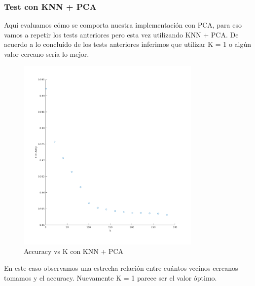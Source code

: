 \subsubsection*{Test con KNN + PCA}
Aquí evaluamos cómo se comporta nuestra implementación con PCA, para eso vamos a repetir los tests anteriores pero esta vez utilizando KNN + PCA.
De acuerdo a lo concluído de los tests anteriores inferimos que utilizar K = 1 o algún valor cercano sería lo mejor. 



\begin{figure}[H]
	\centering
	\includegraphics[width=0.8\textwidth]{img/k_pca_accu.png}
	\caption{Accuracy vs K con KNN + PCA}
	\label{fig:K vs Accuracy con KNN + PCA}
\end{figure}

En este caso observamos una estrecha relación entre cuántos vecinos cercanos tomamos y el accuracy.
Nuevamente K = 1 parece ser el valor óptimo.



